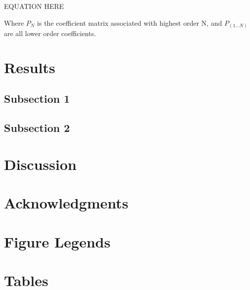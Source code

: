 \documentclass[10pt]{article}
\begin{document}
    EQUATION HERE 
   
Where $P_N$ is the coefficient matrix associated with highest order N, and $P_(1...N)$ are all lower order coefficients. 


\section*{Results}

\subsection*{Subsection 1}

\subsection*{Subsection 2}

\section*{Discussion}

\section*{Acknowledgments}




\section*{Figure Legends}


\section*{Tables}
\end{document}
